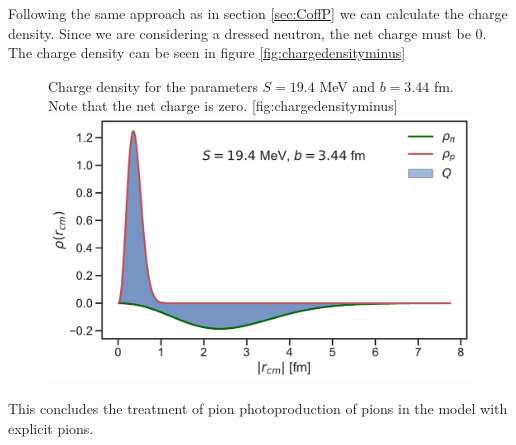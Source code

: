 Following the same approach as in section \ref{sec:CoffP} we can calculate the charge density. Since we are considering a dressed neutron, the net charge must be 0. The charge density can be seen in figure \ref{fig:chargedensityminus}
\begin{figure}[H]
	\begin{sidecaption}{Charge density for the parameters $S=19.4$ MeV and $b=3.44$ fm. Note that the net charge is zero. }[fig:chargedensityminus]
		\includegraphics[width=\linewidth]{Figures/ChargeDensityNeutronMinus.pdf} 
	\end{sidecaption}
\end{figure}
This concludes the treatment of pion photoproduction of pions in the model with explicit pions.
